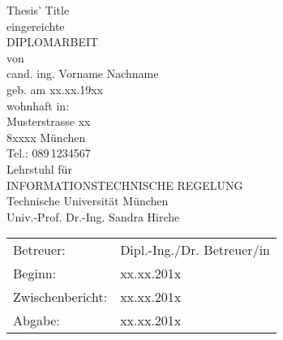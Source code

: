 \documentclass[a4paper,twoside, openright,12pt]{report}
\begin{document}
\pagestyle{empty}
\enlargethispage{4.5cm} %
\begin{center}
\phantom{u}
\vspace{0.5cm}
\Huge{\sc Thesis' Title}\\
\vspace{1.5cm}
                                 \large{eingereichte\\
			  DIPLOMARBEIT\\%
                                           von\\

						\vspace{0.4cm}
					cand. ing. Vorname Nachname\\
						\vspace{0.5cm}
					geb. am xx.xx.19xx\\
					wohnhaft in:\\
					Musterstrasse xx\\
					8xxxx M\"unchen\\
					Tel.: 089\,1234567\\
					\vspace{1.5cm}
					Lehrstuhl f\"ur\\
					INFORMATIONSTECHNISCHE REGELUNG \\
					Technische Universit\"at M\"unchen\\
					\vspace{0.6cm}
                    Univ.-Prof. Dr.-Ing. Sandra Hirche}
\end{center}
\vspace{5.0cm}
\begin{tabular}{ll}
Betreuer: & Dipl.-Ing./Dr. Betreuer/in  \\
Beginn: & xx.xx.201x  \\
Zwischenbericht: &  xx.xx.201x  \\
Abgabe: &  xx.xx.201x \\
\end{tabular}

\cleardoublepage

\phantom{u}
\end{document}
